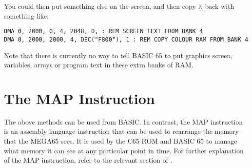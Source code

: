 You could then put something else on the screen, and then copy it back with something like:

\begin{tcolorbox}[colback=black,coltext=white]
\verbatimfont{\codefont}
\begin{verbatim}
DMA 0, 2000, 0, 4, 2048, 0, : REM SCREEN TEXT FROM BANK 4
DMA 0, 2000, 2000, 4, DEC("F800"), 1 : REM COPY COLOUR RAM FROM BANK 4
\end{verbatim}
\end{tcolorbox}

Note that there is currently no way to tell BASIC 65 to put graphics screen, variables,
arrays or program text in these extra banks of RAM.

\section{The MAP Instruction}

The above methods can be used from BASIC. In contrast, the MAP instruction is an assembly
language instruction that can be used to rearrange the memory that the MEGA65 sees.
It is used by the C65 ROM and BASIC 65 to manage what memory it can see at any particular
point in time.  For further explanation of the MAP instruction, refer to the relevant section of .



